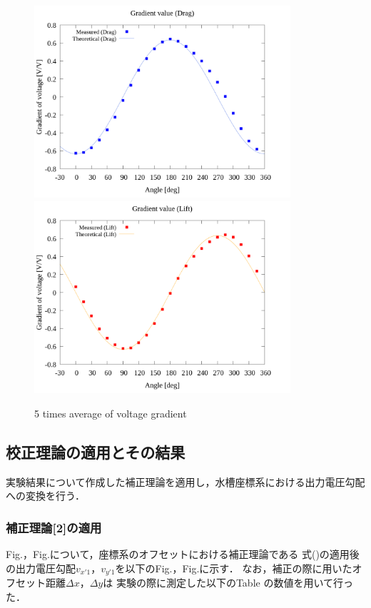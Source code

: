 \begin{figure}[htbp]
		\centering
		\includegraphics[width=95mm]{../../02_workspace/result/2-ex/plot/21/21-1_summary_drag.png}
		\includegraphics[width=95mm]{../../02_workspace/result/2-ex/plot/21/21-1_summary_lift.png}
    \caption{5 times average of voltage gradient}
\end{figure}

\newpage

\subsection{校正理論の適用とその結果}
実験結果について作成した補正理論を適用し，水槽座標系における出力電圧勾配への変換を行う．

\subsubsection{補正理論[2]の適用}
Fig.，Fig.について，座標系のオフセットにおける補正理論である
式()の適用後の出力電圧勾配$v_{x'1}$，$v_{y'1}$を以下のFig.，Fig.に示す．
なお，補正の際に用いたオフセット距離$\Delta x$，$\Delta y$は
実験の際に測定した以下のTable の数値を用いて行った．

